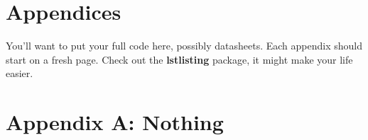 \documentclass[letterpaper,11pt]{texMemo} %
\begin{document}
\section*{Appendices}
You'll want to put your full code here, possibly datasheets. Each appendix should start on a fresh page. Check out the \textbf{lstlisting} package, it might make your life easier. 
\newpage

\section*{Appendix A: Nothing}

\end{document}
